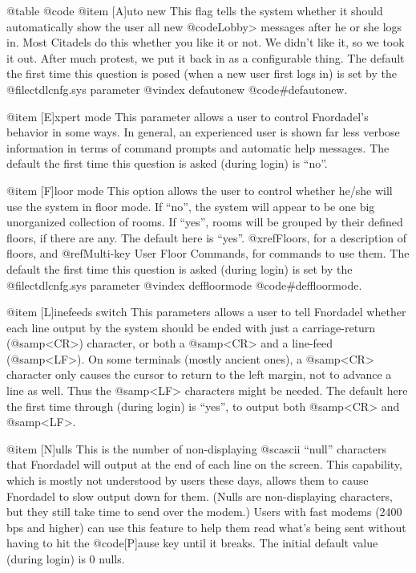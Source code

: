 @table @code
@item [A]uto new
This flag tells the system whether it should automatically show the
user all new @code{Lobby>} messages after he or she logs in.  Most Citadels
do this whether you like it or not.  We didn't like it, so we took
it out.  After much protest, we put it back in as a configurable thing.
The default the first time this question is posed (when a new user first
logs in) is set by the @file{ctdlcnfg.sys} parameter
@vindex defautonew
@code{#defautonew}.

@item [E]xpert mode
This parameter allows a user to control Fnordadel's
behavior in some ways.  In general, an experienced user is
shown far less verbose information in terms of command prompts
and automatic help messages.  The default the first time this
question is asked (during login) is ``no''.

@item [F]loor mode
This option allows the user to control whether he/she will use the system in
floor mode.  If ``no'', the system will appear to be one big unorganized
collection of rooms.  If ``yes'', rooms will be grouped by their defined
floors, if there are any.  The default here is ``yes''.  @xref{Floors}, for a
description of floors, and @ref{Multi-key User Floor Commands}, for commands
to use them.  The default the first time this question is asked
(during login) is set by the @file{ctdlcnfg.sys} parameter
@vindex deffloormode
@code{#deffloormode}.

@item [L]inefeeds switch
This parameters allows a user to tell Fnordadel
whether each line output by the system should be ended with just a carriage-return
(@samp{<CR>}) character, or both a @samp{<CR>} and a line-feed (@samp{<LF>}).  On some
terminals (mostly ancient ones), a @samp{<CR>} character only causes
the cursor to return to the left margin, not to advance a line
as well.  Thus the @samp{<LF>} characters might be needed.  The default
here the first time through (during login) is ``yes'', to output both
@samp{<CR>} and @samp{<LF>}.

@item [N]ulls
This is the number of non-displaying @sc{ascii} ``null'' characters
that Fnordadel will output at the end of each line on the
screen.  This capability, which is mostly not understood by
users these days, allows them to cause Fnordadel to slow
output down for them.  (Nulls are non-displaying characters,
but they still take time to send over the modem.)  Users with fast modems (2400 bps and
higher) can use this feature to help them read what's being
sent without having to hit the @code{[P]ause} key until it breaks.
The initial default value (during login) is 0 nulls.

